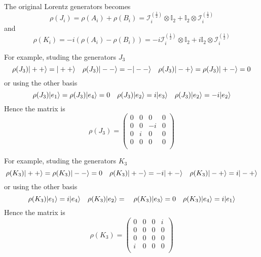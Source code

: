     The original Lorentz generators becomes 
    \begin{equation*}
        \rho(J_i) = \rho(A_i) + \rho(B_i) = \mathcal I_i^{(\frac{1}{2})} \otimes \mathbb I_2 + \mathbb I_2 \otimes \mathcal I_i^{(\frac{1}{2})} 
    \end{equation*}
    and 
    \begin{equation*}
        \rho(K_i) = -i (\rho(A_i) - \rho(B_i)) = - i \mathcal I_i^{(\frac{1}{2})} \otimes \mathbb I_2 + i \mathbb I_2 \otimes \mathcal I_i^{(\frac{1}{2})} 
    \end{equation*}

    For example, studing the generators $J_3$
    \begin{equation*}
        \rho(J_3) \vert++\rangle = \vert++\rangle \quad \rho(J_3) \vert--\rangle = - \vert--\rangle \quad \rho(J_3) \vert-+\rangle = \rho(J_3) \vert+-\rangle = 0
    \end{equation*}
    or using the other basis
    \begin{equation*}
        \rho(J_3) \vert e_1\rangle = \rho(J_3) \vert e_4\rangle = 0 \quad \rho(J_3) \vert e_2\rangle = i \vert e_3\rangle \quad \rho(J_3) \vert e_2\rangle = -i \vert e_2\rangle
    \end{equation*}
    Hence the matrix is 
    \begin{equation*}
        \rho(J_3) = \begin{pmatrix}
            0 & 0 & 0 & 0 \\
            0 & 0 & -i & 0 \\
            0 & i & 0 & 0 \\
            0 & 0 & 0 & 0 \\
        \end{pmatrix}
    \end{equation*}

    For example, studing the generators $K_3$
    \begin{equation*}
        \rho(K_3) \vert++\rangle = \rho(K_3) \vert--\rangle = 0 \quad \rho(K_3) \vert+-\rangle = - i \vert+-\rangle \quad \rho(K_3) \vert-+\rangle = i \vert-+\rangle
    \end{equation*}
    or using the other basis
    \begin{equation*}
        \rho(K_3) \vert e_1\rangle = i \vert e_4\rangle \quad \rho(K_3) \vert e_2\rangle = \quad \rho(K_3) \vert e_3\rangle = 0 \quad \rho(K_3) \vert e_4\rangle = i \vert e_1\rangle
    \end{equation*}
    Hence the matrix is 
    \begin{equation*}
        \rho(K_3) = \begin{pmatrix}
            0 & 0 & 0 & i \\
            0 & 0 & 0 & 0 \\
            0 & 0 & 0 & 0 \\
            i & 0 & 0 & 0 \\
        \end{pmatrix}
    \end{equation*}

